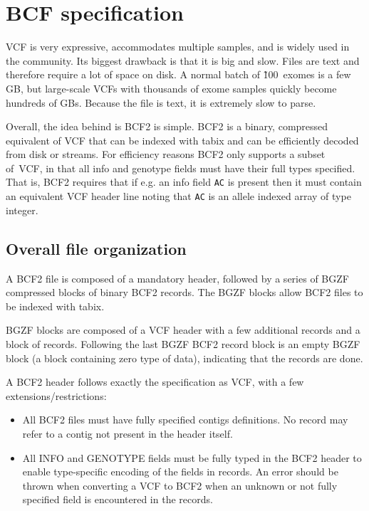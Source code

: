 \documentclass[8pt]{article}
\begin{document}
\pagebreak
\section{BCF specification}

VCF is very expressive, accommodates multiple samples, and is widely used
in the community.  Its biggest drawback is that it is big and slow.
Files are text and therefore require a lot of space on disk.  A normal batch
of \~100~exomes is a few GB, but large-scale VCFs with thousands of exome
samples quickly become hundreds of GBs.  Because the file is text, it is
extremely slow to parse.

Overall, the idea behind is BCF2 is simple.  BCF2 is a binary, compressed
equivalent of VCF that can be indexed with tabix and can be efficiently decoded
from disk or streams.  For efficiency reasons BCF2 only supports a subset
of~VCF, in that all info and genotype fields must have their full types
specified.  That is, BCF2 requires that if e.g. an info field {\tt AC} is
present then it must contain an equivalent VCF header line noting that {\tt AC}
is an allele indexed array of type integer.

\subsection{Overall file organization}

A BCF2 file is composed of a mandatory header, followed by a series of BGZF
compressed blocks of binary BCF2 records.  The BGZF blocks allow BCF2 files
to be indexed with tabix.

BGZF blocks are composed of a VCF header with a few additional records and a
block of records.  Following the last BGZF BCF2 record block is an empty
BGZF block (a block containing zero type of data), indicating that the
records are done.

A BCF2 header follows exactly the specification as VCF, with a few
extensions/restrictions:
\begin{itemize}
\item All BCF2 files must have fully specified contigs definitions.
No record may refer to a contig not present in the header itself.

\item All INFO and GENOTYPE fields must be fully typed in the BCF2 header to
enable type-specific encoding of the fields in records.  An error should be
thrown when converting a VCF to BCF2 when an unknown or not fully specified
field is encountered in the records.
\end{itemize}
\end{document}
